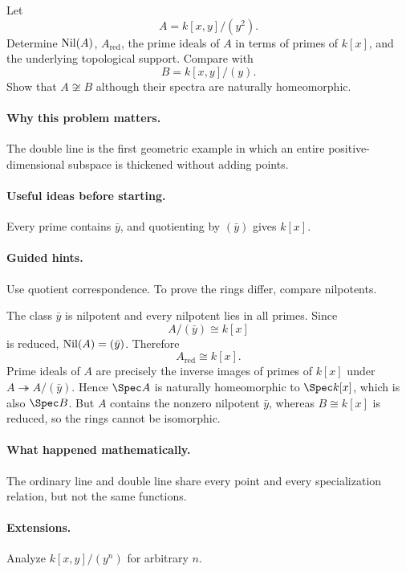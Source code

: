 \begin{problem}
Let
\[
A=k[x,y]/(y^2).
\]
Determine $\operatorname{Nil}(A)$, $A_{\mathrm{red}}$, the prime ideals of $A$ in terms of primes of
$k[x]$, and the underlying topological support.  Compare with
\[
B=k[x,y]/(y).
\]
Show that $A\not\cong B$ although their spectra are naturally homeomorphic.
\end{problem}
\paragraph{Why this problem matters.}
The double line is the first geometric example in which an entire positive-dimensional
subspace is thickened without adding points.
\paragraph{Useful ideas before starting.}
Every prime contains $\bar y$, and quotienting by $(\bar y)$ gives $k[x]$.
\paragraph{Guided hints.}
Use quotient correspondence.  To prove the rings differ, compare nilpotents.
\begin{solution}
The class $\bar y$ is nilpotent and every nilpotent lies in all primes.  Since
\[
A/(\bar y)\cong k[x]
\]
is reduced, $\operatorname{Nil}(A)=(\bar y)$.  Therefore
\[
A_{\mathrm{red}}\cong k[x].
\]
Prime ideals of $A$ are precisely the inverse images of primes of $k[x]$ under
$A\twoheadrightarrow A/(\bar y)$.  Hence $\Spec A$ is naturally homeomorphic to
$\Spec k[x]$, which is also $\Spec B$.  But $A$ contains the nonzero nilpotent $\bar y$,
whereas $B\cong k[x]$ is reduced, so the rings cannot be isomorphic.
\end{solution}
\paragraph{What happened mathematically.}
The ordinary line and double line share every point and every specialization relation, but
not the same functions.
\paragraph{Extensions.}
Analyze $k[x,y]/(y^n)$ for arbitrary $n$.
